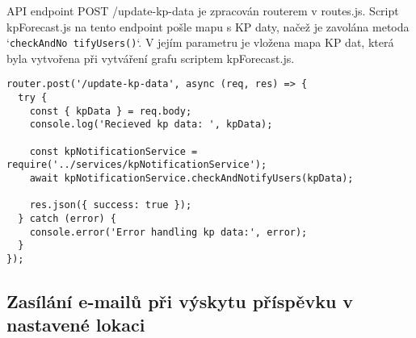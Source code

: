 \par API endpoint POST /update-kp-data je zpracován routerem v routes.js. Script kpForecast.js na tento endpoint pošle mapu s KP daty, načež je zavolána metoda `\texttt{checkAndNo tifyUsers()}`. V jejím parametru je vložena mapa KP dat, která byla vytvořena při vytváření grafu scriptem kpForecast.js.
\begin{lstlisting}[caption = {/update-kp-data endpoint v routes.js},label = {lst:stranka}]
router.post('/update-kp-data', async (req, res) => {
  try {
    const { kpData } = req.body;
    console.log('Recieved kp data: ', kpData);
    
    const kpNotificationService = require('../services/kpNotificationService');
    await kpNotificationService.checkAndNotifyUsers(kpData);
    
    res.json({ success: true });
  } catch (error) {
    console.error('Error handling kp data:', error);
  }
});
\end{lstlisting}

\subsection{Zasílání e-mailů při výskytu příspěvku v nastavené lokaci}

